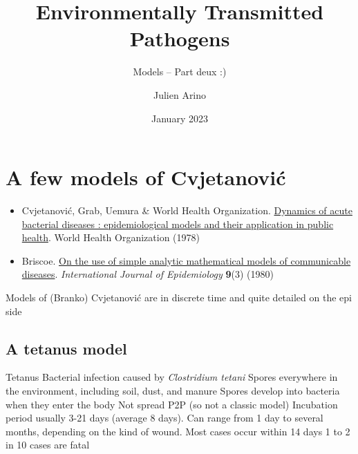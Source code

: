 \documentclass[aspectratio=169]{beamer}
\title{Environmentally Transmitted Pathogens}
\subtitle{Models -- Part deux :)}
\author{Julien Arino}
\date{January 2023}
\begin{document}

\begin{frame}
  \titlepage
\end{frame}
\addtocounter{page}{-1}

\section{A few models of Cvjetanovi\'c}

\begin{frame}
  \begin{itemize}
    \item Cvjetanovi\'c, Grab, Uemura \& World Health Organization. \href{https://apps.who.int/iris/handle/10665/43033}{Dynamics of acute bacterial diseases : epidemiological models and their application in public health}. World Health Organization (1978)  
    \item Briscoe. \href{https://doi.org/10.1093/ije/9.3.265}{On the use of simple analytic mathematical models of communicable diseases}.
    \emph{International Journal of Epidemiology} \textbf{9}(3) (1980)
  \end{itemize}
  \vfill
  Models of (Branko) Cvjetanovi\'c are in discrete time and quite detailed on the epi side
\end{frame}
\subsection{A tetanus model}

\begin{frame}{Tetanus}
  Bacterial infection caused by \emph{Clostridium tetani}
  \vfill
  Spores everywhere in the environment, including soil, dust, and manure
  \vfill
  Spores develop into bacteria when they enter the body
  \vfill
  Not spread P2P (so not a classic model)
  \vfill
  Incubation period usually 3-21 days (average 8 days). Can range from 1 day to several months, depending on the kind of wound. Most cases occur within 14 days
  \vfill
  1 to 2 in 10 cases are fatal
\end{frame}

\end{document}

